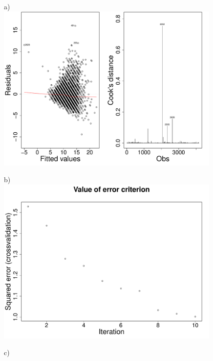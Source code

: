 \documentclass[10pt, paper=a4]{article}
\begin{document}
\begin{figure}[h]
  \begin{minipage}{0.3\textwidth}
    a)\\
    \includegraphics[width = 0.99\textwidth]{modelcheck.pdf}
  \end{minipage} \hfill
  \begin{minipage}{0.3\textwidth}
    b)\\
    \includegraphics[width = 0.99\textwidth]{forwardselection.pdf}
  \end{minipage} \hfill
  \begin{minipage}{0.3\textwidth}
    c)\\

\end{minipage}
\end{figure}
\end{document}
